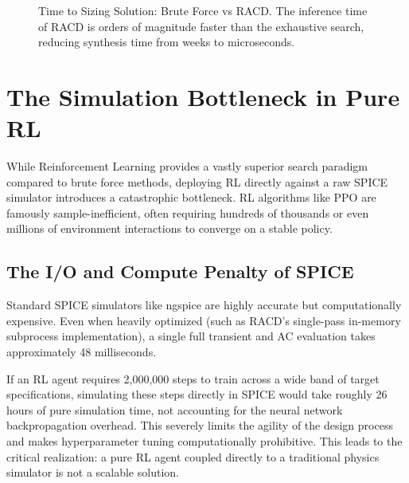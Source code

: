 \documentclass[11pt, a4paper]{article}
\begin{document}
\begin{figure}[!htbp]
    \centering
    \caption{Time to Sizing Solution: Brute Force vs RACD. The inference time of RACD is orders of magnitude faster than the exhaustive search, reducing synthesis time from weeks to microseconds.}
    \label{fig:bruteforce}
\end{figure}

\section{The Simulation Bottleneck in Pure RL}
While Reinforcement Learning provides a vastly superior search paradigm compared to brute force methods, deploying RL directly against a raw SPICE simulator introduces a catastrophic bottleneck. RL algorithms like PPO are famously sample-inefficient, often requiring hundreds of thousands or even millions of environment interactions to converge on a stable policy.

\subsection*{The I/O and Compute Penalty of SPICE}
Standard SPICE simulators like ngspice are highly accurate but computationally expensive. Even when heavily optimized (such as RACD's single-pass in-memory subprocess implementation), a single full transient and AC evaluation takes approximately 48 milliseconds.

If an RL agent requires 2,000,000 steps to train across a wide band of target specifications, simulating these steps directly in SPICE would take roughly 26 hours of pure simulation time, not accounting for the neural network backpropagation overhead. This severely limits the agility of the design process and makes hyperparameter tuning computationally prohibitive. This leads to the critical realization: a pure RL agent coupled directly to a traditional physics simulator is not a scalable solution.
\end{document}
